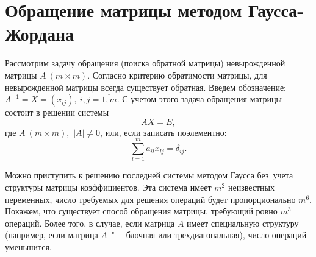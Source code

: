 \documentclass[11pt,a4paper,twoside,listtotoc,bibtotoc]{report}
\numberwithin{equation}{section}
\newtheorem*{definition}{Определение}
\theoremstyle{definition}
\theoremstyle{plain}
\begin{document}
\section{Обращение матрицы методом Гаусса-Жордана}
%
Рассмотрим задачу обращения (поиска обратной матрицы) невырожденной матрицы
$A~(m \times m)$.
%
%
Согласно критерию обратимости матрицы, для невырожденной матрицы всегда
существует обратная. Введем обозначение:
$
A^{-1}=X=(x_{ij}),~i,j = \overline{1,m}.
$
С учетом этого задача обращения матрицы состоит в решении системы
%
\begin{equation}
    \label{eq:AX-system}
    AX=E,
\end{equation}
%
где $A~(m \times m)$,~$|A| \ne 0$, или, если записать поэлементно:
%
\begin{equation}
    \label{eq:AX-sum-system}
    \sum\limits_{l=1}^m a_{il}x_{lj}=\delta_{ij}.
\end{equation}
%

Можно приступить к решению последней системы методом Гаусса без~учета
структуры матрицы коэффициентов.
Эта система имеет $m^2$ неизвестных переменных, число требуемых для решения
операций будет
пропорционально $m^6$. Покажем, что существует способ обращения матрицы,
требующий ровно $m^3$ операций. Более того, в случае, если матрица $A$ имеет
специальную структуру (например, если матрица $A$~"--- блочная или
трехдиагональная), число операций уменьшится.
\end{document}
